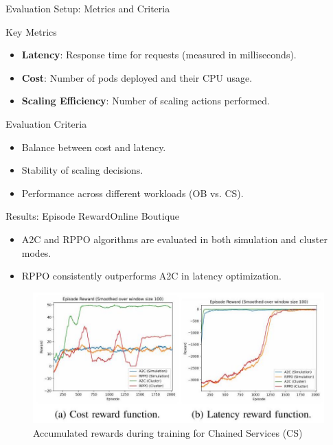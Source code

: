 \documentclass{beamer}
\begin{document}
\begin{frame}{Evaluation Setup: Metrics and Criteria}
    \begin{block}{Key Metrics}
        \begin{itemize}
            \item \textbf{Latency}: Response time for requests (measured in milliseconds).
            \item \textbf{Cost}: Number of pods deployed and their CPU usage.
            \item \textbf{Scaling Efficiency}: Number of scaling actions performed.
        \end{itemize}
    \end{block}
    \begin{block}{Evaluation Criteria}
        \begin{itemize}
            \item Balance between cost and latency.
            \item Stability of scaling decisions.
            \item Performance across different workloads (OB vs. CS).
        \end{itemize}
    \end{block}
\end{frame}

\begin{frame}{Results: Episode Reward}{Online Boutique}
    \begin{itemize}
        \item A2C and RPPO algorithms are evaluated in both simulation and cluster modes.
        \item RPPO consistently outperforms A2C in latency optimization.
    \end{itemize}
    \begin{figure}
        \includegraphics[width=\textwidth]{images/2024_11_17_21ad14b6196e5740bf69g-7.jpg} %
        \caption*{Accumulated rewards during training for Chained Services (CS)}
    \end{figure}
\end{frame}
\end{document}
